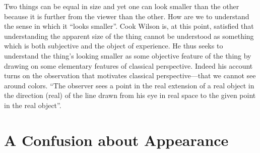 \documentclass[11pt]{article}
\begin{document}
Two things can be equal in size and yet one can look smaller than the other because it is further from the viewer than the other. How are we to understand the sense in which it ``looks smaller''. Cook Wilson is, at this point, satisfied that understanding the apparent size of the thing cannot be understood as something which is both subjective and the object of experience. He thus seeks to understand the thing's looking smaller as some objective feature of the thing by drawing on some elementary features of classical perspective. Indeed his account turns on the observation that motivates classical perspective---that we cannot see around colors. ``The observer sees a point in the real extension of a real object in the direction (real) of the line drawn from his eye in real space to the given point in the real object''.



\section{A Confusion about Appearance}\label{sec:a_confusion_about_appearane} %



\end{document}
